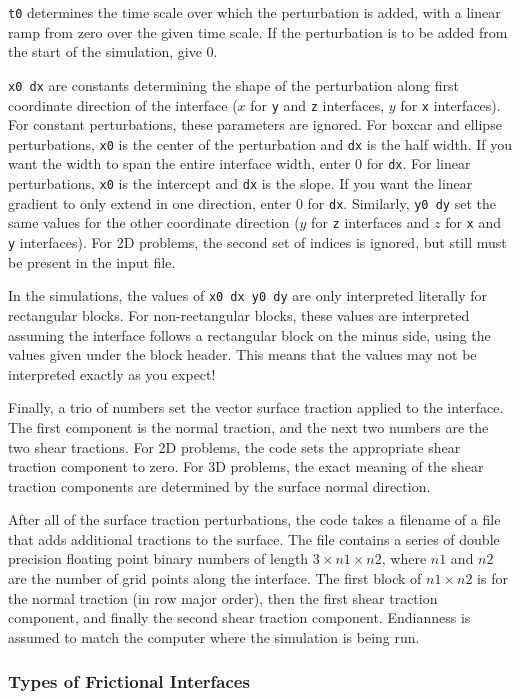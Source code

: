 \documentclass[12pt]{article}   	%
\begin{document}
{\tt t0} determines the time scale over which the perturbation is added, with a linear ramp from zero over the given time scale. If the perturbation is to be added from the start of the simulation, give 0.

{\tt x0 dx} are constants determining the shape of the perturbation along first coordinate direction of the interface ($x$ for {\tt y} and {\tt z} interfaces, $y$ for {\tt x} interfaces). For constant perturbations, these parameters are ignored. For boxcar and ellipse perturbations, {\tt x0} is the center of the perturbation and {\tt dx} is the half width. If you want the width to span the entire interface width, enter 0 for {\tt dx}. For linear perturbations, {\tt x0} is the intercept and {\tt dx} is the slope. If you want the linear gradient to only extend in one direction, enter 0 for {\tt dx}. Similarly, {\tt y0 dy} set the same values for the other coordinate direction ($y$ for {\tt z} interfaces and $z$ for {\tt x} and {\tt y} interfaces). For 2D problems, the second set of indices is ignored, but still must be present in the input file.

In the simulations, the values of {\tt x0 dx y0 dy} are only interpreted literally for rectangular blocks. For non-rectangular blocks, these values are interpreted assuming the interface follows a rectangular block on the minus side, using the values given under the block header. This means that the values may not be interpreted exactly as you expect!

Finally, a trio of numbers set the vector surface traction applied to the interface. The first component is the normal traction, and the next two numbers are the two shear tractions. For 2D problems, the code sets the appropriate shear traction component to zero. For 3D problems, the exact meaning of the shear traction components are determined by the surface normal direction.

After all of the surface traction perturbations, the code takes a filename of a file that adds additional tractions to the surface. The file contains a series of double precision floating point binary numbers of length $3\times n1 \times n2$, where $n1$ and $n2$ are the number of grid points along the interface. The first block of $n1\times n2$ is for the normal traction (in row major order), then the first shear traction component, and finally the second shear traction component. Endianness is assumed to match the computer where the simulation is being run.

\subsubsection{Types of Frictional Interfaces}
\end{document}
